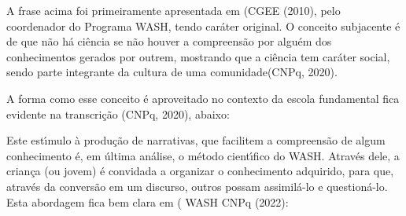 \documentclass[
12pt,		%
openright,	%
twoside,  %
a4paper,			%
chapter=TITLE,		%
english,			%
french,				%
spanish,			%
brazil				%
]{USPSC-classe/USPSC}
\begin{document}
\noindent\begin{center}\mbox{\centering{}}\end{center}


A frase acima foi primeiramente apresentada em (CGEE (2010), pelo coordenador do Programa WASH, tendo car\'ater original. O conceito subjacente \'e de que \textquotedbl n\~ao h\'a ci\^encia se n\~ao houver a compreens\~ao por algu\'em dos conhecimentos gerados por outrem, mostrando que a ci\^encia tem car\'ater social, sendo parte integrante da cultura de uma comunidade\textquotedbl  (CNPq, 2020).









A forma como esse conceito \'e aproveitado no contexto da escola fundamental fica evidente na transcri\c{c}\~ao (CNPq, 2020), abaixo:










\noindent\begin{center}\mbox{\centering{}}\end{center}


Este est\'{\i}mulo \`a produ\c{c}\~ao de narrativas, que facilitem a compreens\~ao de algum conhecimento \'e, em \'ultima an\'alise, o m\'etodo cient\'{\i}fico do WASH. Atrav\'es dele, a crian\c{c}a (ou jovem) \'e convidada a organizar o conhecimento adquirido, para que, atrav\'es da convers\~ao em um discurso, outros possam assimil\'a-lo e question\'a-lo. Esta abordagem fica bem clara em ( WASH CNPq (2022):
\end{document}
